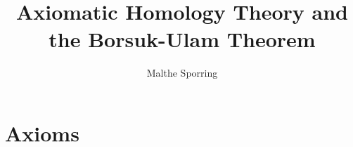 \documentclass[11pt,a4paper]{article}
\title{Axiomatic Homology Theory and the Borsuk-Ulam Theorem}
\author{Malthe Sporring}
\numberwithin{thm}{section}
\begin{document}
\maketitle

\section{Axioms}

\end{document}
